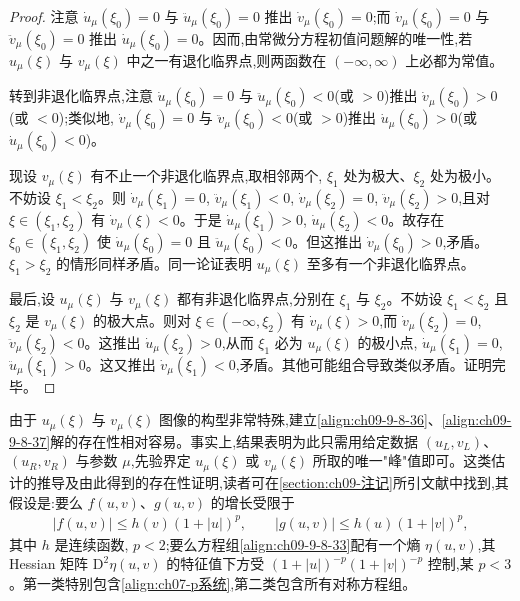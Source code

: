 \documentclass[../../main.tex]{subfiles}
\begin{document}
\begin{proof}
注意 $\dot{u}_{\mu}(\xi_{0})=0$ 与 $\ddot{u}_{\mu}(\xi_{0})=0$ 推出 $\dot{v}_{\mu}(\xi_{0})=0$;而 $\dot{v}_{\mu}(\xi_{0})=0$ 与 $\ddot{v}_{\mu}(\xi_{0})=0$ 推出 $\dot{u}_{\mu}(\xi_{0})=0$。因而,由常微分方程初值问题解的唯一性,若 $u_{\mu}(\xi)$ 与 $v_{\mu}(\xi)$ 中之一有退化临界点,则两函数在 $(-\infty,\infty)$ 上必都为常值。

转到非退化临界点,注意 $\dot{u}_{\mu}(\xi_{0})=0$ 与 $\ddot{u}_{\mu}(\xi_{0})<0$(或 $>0$)推出 $\dot{v}_{\mu}(\xi_{0})>0$(或 $<0$);类似地, $\dot{v}_{\mu}(\xi_{0})=0$ 与 $\ddot{v}_{\mu}(\xi_{0})<0$(或 $>0$)推出 $\dot{u}_{\mu}(\xi_{0})>0$(或 $\dot{u}_{\mu}(\xi_{0})<0$)。

现设 $v_{\mu}(\xi)$ 有不止一个非退化临界点,取相邻两个, $\xi_{1}$ 处为极大、$\xi_{2}$ 处为极小。不妨设 $\xi_{1}<\xi_{2}$。则 $\dot{v}_{\mu}(\xi_{1})=0$, $\ddot{v}_{\mu}(\xi_{1})<0$, $\dot{v}_{\mu}(\xi_{2})=0$, $\ddot{v}_{\mu}(\xi_{2})>0$,且对 $\xi\in(\xi_{1},\xi_{2})$ 有 $\dot{v}_{\mu}(\xi)<0$。于是 $\dot{u}_{\mu}(\xi_{1})>0$, $\dot{u}_{\mu}(\xi_{2})<0$。故存在 $\xi_{0}\in(\xi_{1},\xi_{2})$ 使 $\dot{u}_{\mu}(\xi_{0})=0$ 且 $\ddot{u}_{\mu}(\xi_{0})<0$。但这推出 $\dot{v}_{\mu}(\xi_{0})>0$,矛盾。$\xi_{1}>\xi_{2}$ 的情形同样矛盾。同一论证表明 $u_{\mu}(\xi)$ 至多有一个非退化临界点。

最后,设 $u_{\mu}(\xi)$ 与 $v_{\mu}(\xi)$ 都有非退化临界点,分别在 $\xi_{1}$ 与 $\xi_{2}$。不妨设 $\xi_{1}<\xi_{2}$ 且 $\xi_{2}$ 是 $v_{\mu}(\xi)$ 的极大点。则对 $\xi\in(-\infty,\xi_{2})$ 有 $\dot{v}_{\mu}(\xi)>0$,而 $\dot{v}_{\mu}(\xi_{2})=0$, $\ddot{v}_{\mu}(\xi_{2})<0$。这推出 $\dot{u}_{\mu}(\xi_{2})>0$,从而 $\xi_{1}$ 必为 $u_{\mu}(\xi)$ 的极小点, $\dot{u}_{\mu}(\xi_{1})=0$, $\ddot{u}_{\mu}(\xi_{1})>0$。这又推出 $\dot{v}_{\mu}(\xi_{1})<0$,矛盾。其他可能组合导致类似矛盾。证明完毕。
\end{proof}

由于 $u_{\mu}(\xi)$ 与 $v_{\mu}(\xi)$ 图像的构型非常特殊,建立\eqref{align:ch09-9-8-36}、\eqref{align:ch09-9-8-37}解的存在性相对容易。事实上,结果表明为此只需用给定数据 $(u_{L},v_{L})$、$(u_{R},v_{R})$ 与参数 $\mu$,先验界定 $u_{\mu}(\xi)$ 或 $v_{\mu}(\xi)$ 所取的唯一"峰"值即可。这类估计的推导及由此得到的存在性证明,读者可在\cref{section:ch09-注记}所引文献中找到,其假设是:要么 $f(u,v)$、$g(u,v)$ 的增长受限于
\begin{align}
|f(u,v)|\leqslant h(v)(1+|u|)^{p},\qquad|g(u,v)|\leqslant h(u)(1+|v|)^{p},
\label{align:ch09-9-8-38}
\end{align}
其中 $h$ 是连续函数, $p<2$;要么方程组\eqref{align:ch09-9-8-33}配有一个熵 $\eta(u,v)$,其 Hessian 矩阵 $\mathrm{D}^{2}\eta(u,v)$ 的特征值下方受 $(1+|u|)^{-p}(1+|v|)^{-p}$ 控制,某 $p<3$。第一类特别包含\eqref{align:ch07-p系统},第二类包含所有对称方程组。
\end{document}
